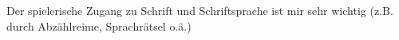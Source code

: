 Der spielerische Zugang zu Schrift und Schriftsprache ist mir sehr wichtig (z.B. durch Abzählreime, Sprachrätsel o.ä.)